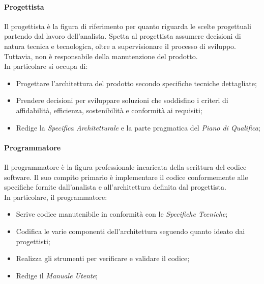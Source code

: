 \paragraph{Progettista}\label{progettista}
Il progettista è la figura di riferimento per quanto riguarda le scelte progettuali partendo dal lavoro dell'analista. Spetta al progettista assumere decisioni di natura tecnica e tecnologica, oltre a supervisionare il processo di sviluppo. Tuttavia, non è responsabile della manutenzione del prodotto. \\
In particolare si occupa di:
\begin{itemize}
    \item Progettare l'architettura del prodotto secondo specifiche tecniche dettagliate;
    \item Prendere decisioni per sviluppare soluzioni che soddisfino i criteri di affidabilità, efficienza, sostenibilità e conformità ai requisiti;
    \item Redige la \textit{Specifica Architetturale} e la parte pragmatica del \textit{Piano di Qualifica};
\end{itemize}

\paragraph{Programmatore}
\label{par:programmatore}
Il programmatore è la figura professionale incaricata della scrittura del codice software. Il suo compito primario è implementare il codice conformemente alle specifiche fornite dall'analista e all'architettura definita dal progettista. \\
In particolare, il programmatore:
\begin{itemize}
    \item Scrive codice manutenibile in conformità con le \textit{Specifiche Tecniche};
    \item Codifica le varie componenti dell'architettura seguendo quanto ideato dai progettisti;
    \item Realizza gli strumenti per verificare e validare il codice;
    \item Redige il \textit{Manuale Utente};
\end{itemize}

